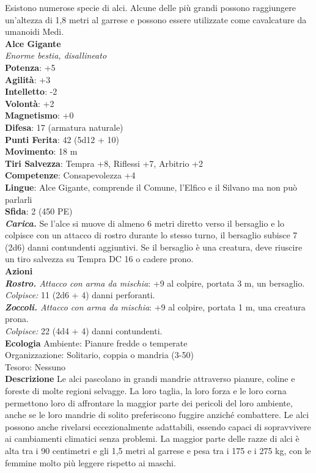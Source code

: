 \begin{multicols}{2}
Esistono numerose specie di alci. Alcune delle più grandi possono raggiungere un'altezza di 1,8 metri al garrese e possono essere utilizzate come cavalcature da umanoidi Medi.\\

\medskip\textbf{Alce Gigante}\\
\emph{Enorme bestia, disallineato}\\
\textbf{Potenza}: +5\\
\textbf{Agilità}: +3\\
\textbf{Intelletto}: -2\\
\textbf{Volontà}: +2\\
\textbf{Magnetismo}: +0\\
\textbf{Difesa}: 17 (armatura naturale)\\
\textbf{Punti Ferita}: 42 (5d12 + 10)\\
\textbf{Movimento}: 18 m\\
\textbf{Tiri Salvezza}:  Tempra +8, Riflessi +7, Arbitrio +2\\
\textbf{Competenze}: Consapevolezza +4\\
\textbf{Lingue}: Alce Gigante, comprende il Comune, l'Elfico e il Silvano ma non può parlarli\\
\textbf{Sfida}: 2 (450 PE)\smallskip\\
\emph{\textbf{Carica.}} Se l'alce si muove di almeno 6 metri diretto verso il bersaglio e lo colpisce con un attacco di rostro durante lo stesso turno, il bersaglio subisce 7 (2d6) danni contundenti aggiuntivi. Se il bersaglio è una creatura, deve riuscire un tiro salvezza su Tempra DC  16 o cadere prono.\\
\smallskip\textbf{Azioni}\\
\emph{\textbf{Rostro.} Attacco con arma da mischia}: +9 al colpire, portata 3 m, un bersaglio.\\
\emph{Colpisce:} 11 (2d6 + 4) danni perforanti.\\
\emph{\textbf{Zoccoli.} Attacco con arma da mischia}: +9 al colpire, portata 1 m, una creatura prona.\\
\emph{Colpisce:} 22 (4d4 + 4) danni contundenti.\\
\textbf{Ecologia}
Ambiente: Pianure fredde o temperate\\
Organizzazione: Solitario, coppia o mandria (3-50)\\
Tesoro: Nessuno\\
\textbf{Descrizione}
Le alci pascolano in grandi mandrie attraverso pianure, coline e foreste di molte regioni selvagge. La loro taglia, la loro forza e le loro corna permettono loro di affrontare la maggior parte dei pericoli del loro ambiente, anche se le loro mandrie di solito preferiscono fuggire anziché combattere. Le alci possono anche rivelarsi eccezionalmente adattabili, essendo capaci di sopravvivere ai cambiamenti climatici senza problemi. La maggior parte delle razze di alci è alta tra i 90 centimetri e gli 1,5 metri al garrese e pesa tra i 175 e i 275 kg, con le femmine molto più leggere rispetto ai maschi.\\

\end{multicols}
